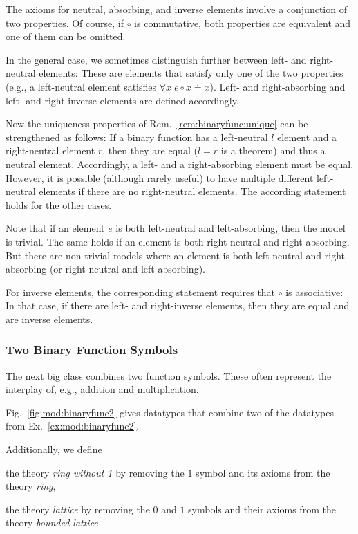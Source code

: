 \begin{remark}\label{rem:binaryfunc:leftright}
The axioms for neutral, absorbing, and inverse elements involve a conjunction of two properties.
Of course, if $\circ$ is commutative, both properties are equivalent and one of them can be omitted.

In the general case, we sometimes distinguish further between left- and right-neutral elements: These are elements that satisfy only one of the two properties (e.g., a left-neutral element satisfies $\forall x\;e\circ x\doteq x$).
Left- and right-absorbing and left- and right-inverse elements are defined accordingly.

Now the uniqueness properties of Rem.~\ref{rem:binaryfunc:unique} can be strengthened as follows: If a binary function has a left-neutral $l$ element and a right-neutral element $r$, then they are equal ($l\doteq r$ is a theorem) and thus a neutral element.
Accordingly, a left- and a right-absorbing element must be equal.
However, it is possible (although rarely useful) to have multiple different left-neutral elements if there are no right-neutral elements.
The according statement holds for the other cases.

Note that if an element $e$ is both left-neutral and left-absorbing, then the model is trivial.
The same holds if an element is both right-neutral and right-absorbing.
But there are non-trivial models where an element is both left-neutral and right-absorbing (or right-neutral and left-absorbing).

For inverse elements, the corresponding statement requires that $\circ$ is associative: In that case, if there are left- and right-inverse elements, then they are equal and are inverse elements.
\end{remark}

\subsubsection{Two Binary Function Symbols}

The next big class combines two function symbols.
These often represent the interplay of, e.g., addition and multiplication.

\begin{example}\label{ex:mod:binaryfunc2}
Fig.~\ref{fig:mod:binaryfunc2} gives datatypes that combine two of the datatypes from Ex.~\ref{ex:mod:binaryfunc2}.

Additionally, we define
\begin{compactitem}
\item the theory \emph{ring without 1} by removing the $1$ symbol and its axioms from the theory \emph{ring},
\item the theory \emph{lattice} by removing the $0$ and $1$ symbols and their axioms from the theory \emph{bounded lattice}
\end{compactitem}
\end{example}

